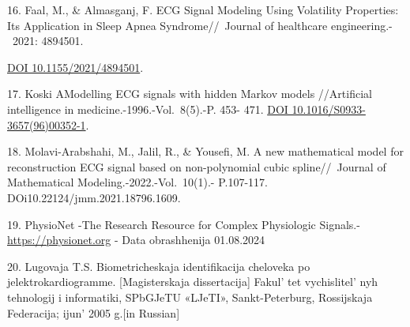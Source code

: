 \begin{references}
16. Faal, M., \& Almasganj, F. ECG Signal Modeling Using Volatility
Properties: Its Application in Sleep Apnea Syndrome//~Journal of
healthcare engineering.-~2021: 4894501.

\href{https://doi.org/10.1155/2021/4894501}{DOI 10.1155/2021/4894501}.

17. Koski AModelling ECG signals with hidden Markov models //Artificial
intelligence in medicine.-1996.-Vol.~8(5).-P. 453- 471.
\href{https://doi.org/10.1016/S0933-3657(96)00352-1}{DOI
10.1016/S0933-3657(96)00352-1}.

18. Molavi-Arabshahi, M., Jalil, R., \& Yousefi, M. A new mathematical
model for reconstruction ECG signal based on non-polynomial cubic
spline//~Journal of Mathematical Modeling.-2022.-Vol.~10(1).- P.107-117.
DOi10.22124/jmm.2021.18796.1609.

19. PhysioNet -The Research Resource for Complex Physiologic Signals.-
\href{https://physionet.org}{https://physionet.org} - Data obrashhenija 01.08.2024

20. Lugovaja T.S. Biometricheskaja identifikacija cheloveka po
jelektrokardiogramme. {[}Magisterskaja dissertacija{]}
Fakul' tet vychislitel' nyh tehnologij i
informatiki, SPbGJeTU «LJeTI», Sankt-Peterburg, Rossijskaja Federacija;
ijun'{} 2005 g.{[}in Russian{]}
\end{references}

